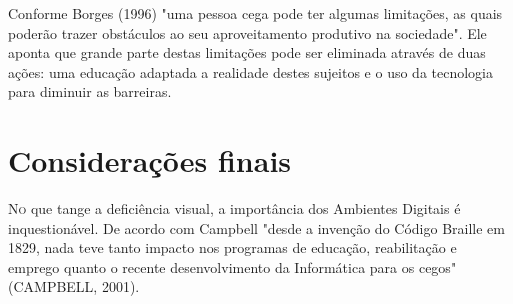 Conforme Borges (1996) "uma pessoa cega pode ter algumas limitações, as quais poderão trazer obstáculos ao seu aproveitamento produtivo na sociedade". Ele aponta que grande parte destas limitações pode ser eliminada através de duas ações: uma educação adaptada a realidade destes sujeitos e o uso da tecnologia para diminuir as barreiras.

\section{Considerações finais}
\lettrine{N}{o} que tange a deficiência visual, a importância dos Ambientes Digitais é inquestionável. De acordo com Campbell "desde a invenção do Código Braille em 1829, nada teve tanto impacto nos programas de educação, reabilitação e emprego quanto o recente desenvolvimento da Informática para os cegos" (CAMPBELL, 2001).
